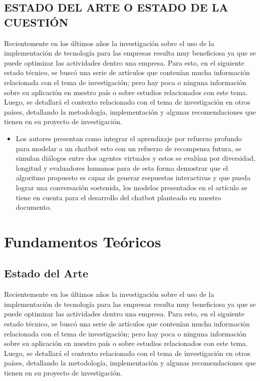 \documentclass[12pt,a4paper,oneside]{article}
\begin{document}
\subsection{ESTADO DEL ARTE O ESTADO DE LA CUESTIÓN}

    Recientemente en los últimos años la investigación sobre el uso de la implementación de tecnología para las empresas resulta muy beneficiosa ya que se puede optimizar las actividades dentro una empresa. Para esto, en el siguiente estado técnico, se buscó una serie de artículos que contenían mucha información relacionada con el tema de investigación; pero hay poca o ninguna información sobre su aplicación en nuestro país o sobre estudios relacionados con este tema. Luego, se detallará el contexto relacionado con el tema de investigación en otros países, detallando la metodología, implementación y algunas recomendaciones que tienen en su proyecto de investigación.

\begin{itemize}
  \item Los autores presentan como integrar el aprendizaje por refuerzo profundo para modelar a un chatbot esto con un refuerzo de recompensa futura, se simulan diálogos entre dos agentes virtuales y estos se evalúan por diversidad, longitud y evaluadores humanos para de esta forma demostrar que el algoritmo propuesto es capaz de generar respuestas interactivas y que pueda lograr una conversación sostenida, los modelos presentados en el artículo se tiene en cuenta para el desarrollo del chatbot planteado en nuestro documento.
\end{itemize}


\section{Fundamentos Teóricos}
\subsection{Estado del Arte}
    Recientemente en los últimos años la investigación sobre el uso de la implementación de tecnología para las empresas resulta muy beneficiosa ya que se puede optimizar las actividades dentro una empresa. Para esto, en el siguiente estado técnico, se buscó una serie de artículos que contenían mucha información relacionada con el tema de investigación; pero hay poca o ninguna información sobre su aplicación en nuestro país o sobre estudios relacionados con este tema. Luego, se detallará el contexto relacionado con el tema de investigación en otros países, detallando la metodología, implementación y algunas recomendaciones que tienen en su proyecto de investigación.
\end{document}
